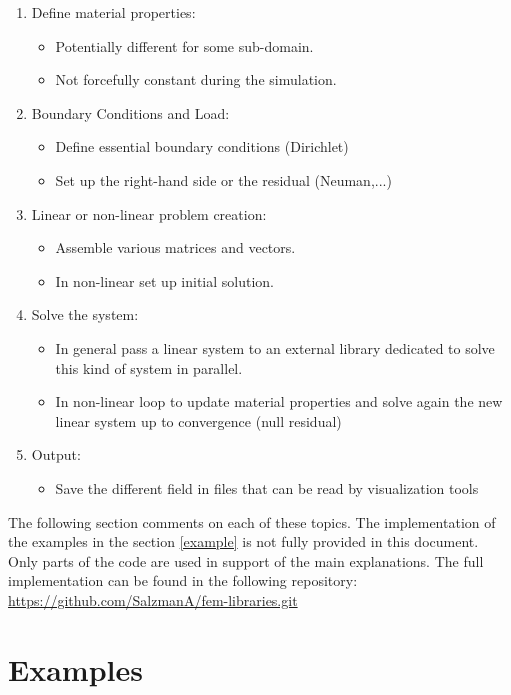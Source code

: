 \documentclass[12pt]{article}
\begin{document}
\begin{enumerate}
\item Define material properties:\label{point_mat}
\begin{itemize}
	\item Potentially different for some sub-domain.
	\item Not forcefully constant during the simulation.
\end{itemize}
\item Boundary Conditions and Load:\label{point_bc}
\begin{itemize}
	\item Define essential boundary conditions (Dirichlet)
	\item Set up the right-hand side or the residual (Neuman,...)
\end{itemize}
\item Linear or non-linear problem creation:\label{point_matrix}
\begin{itemize}
	\item Assemble various matrices and vectors.
	\item In non-linear set up initial solution.
\end{itemize}
\item Solve the system:\label{point_solve}
\begin{itemize}
	\item In general pass a linear system to an external library dedicated to solve this kind of system in parallel.
	\item In non-linear loop to update material properties and solve again the new linear system up to convergence (null residual)
\end{itemize}
\item Output:\label{point_out}
\begin{itemize}
	\item Save the different field in files that can be read by visualization tools
\end{itemize}
\end{enumerate}

The following section comments on each of these topics. The implementation of the examples in the  section \ref{example} is not fully provided in this document. 
Only parts of the code are used in support of the main explanations.
The full implementation can be found in the following repository:
\noindent \url{https://github.com/SalzmanA/fem-libraries.git}

\section{Examples\label{example}}
\end{document}
